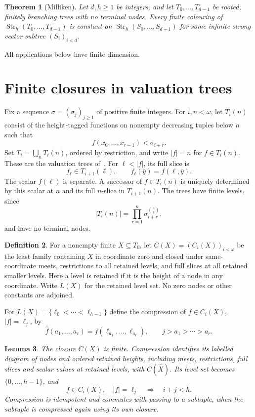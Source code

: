 \documentclass{article}
\numberwithin{equation}{section}
\newtheorem{theorem}{Theorem}[section]
\newtheorem{lemma}[theorem]{Lemma}
\theoremstyle{definition}
\newtheorem{definition}[theorem]{Definition}
\DeclareMathOperator{\Str}{Str}
\begin{document}
\begin{theorem}[Milliken]\label{thm:milliken}
Let $d,h\geq1$ be integers, and let $T_0,\ldots,T_{d-1}$ be rooted, finitely branching
trees with no terminal nodes. Every finite colouring of
$\Str_h(T_0,\ldots,T_{d-1})$ is constant on
$\Str_h(S_0,\ldots,S_{d-1})$ for some infinite strong vector subtree
$(S_i)_{i<d}$.
\end{theorem}

All applications below have finite dimension.
\section{Finite closures in valuation trees}\label{sec:source}

Fix a sequence $\sigma=(\sigma_j)_{j\geq1}$ of positive finite integers.
For $i,n<\omega$, let $T_i(n)$ consist of the height-tagged functions on
nonempty decreasing tuples below $n$ such that
\[
f(x_0,\ldots,x_{r-1})<\sigma_{i+r}.
\]
Set $T_i=\bigcup_nT_i(n)$, ordered by restriction, and write $|f|=n$ for
$f\in T_i(n)$. These are the valuation trees of~\cite[Section~3]{InfiniteLanguages}.
For $\ell<|f|$, its full slice is
\[
f_\ell\in T_{i+1}(\ell),\qquad
f_\ell(\bar y)=f(\ell,\bar y).
\]
The scalar $f(\ell)$ is separate. A successor of $f\in T_i(n)$ is uniquely
determined by this scalar at $n$ and its full $n$-slice in $T_{i+1}(n)$.
The trees have finite levels, since
\[
|T_i(n)|=\prod_{r=1}^n\sigma_{i+r}^{\binom nr},
\]
and have no terminal nodes.

\begin{definition}\label{def:closure}
For a nonempty finite $X\subseteq T_0$, let $C(X)=(C_i(X))_{i<\omega}$
be the least family containing $X$ in coordinate zero and closed under
same-coordinate meets, restrictions to all retained levels, and full slices
at all retained smaller levels. Here a level is retained if it is the height
of a node in any coordinate. Write $L(X)$ for the retained level set.
No zero nodes or other constants are adjoined.
\end{definition}

For $L(X)=\{\ell_0<\cdots<\ell_{h-1}\}$ define the compression of
$f\in C_i(X)$, $|f|=\ell_j$, by
\begin{equation}\label{eq:compression}
\widehat f(a_1,\ldots,a_r)=f(\ell_{a_1},\ldots,\ell_{a_r}),
\qquad j>a_1>\cdots>a_r.
\end{equation}

\begin{lemma}\label{lem:compression}
The closure $C(X)$ is finite. Compression identifies its labelled diagram
of nodes and ordered retained heights, including meets, restrictions,
full slices and scalar values at retained levels, with $C(\widehat X)$. Its level set becomes $\{0,\ldots,h-1\}$, and
\begin{equation}\label{eq:triangle}
f\in C_i(X),\quad |f|=\ell_j\quad\Longrightarrow\quad i+j<h.
\end{equation}
Compression is idempotent and commutes with passing to a subtuple, when the
subtuple is compressed again using its own closure.
\end{lemma}
\end{document}
